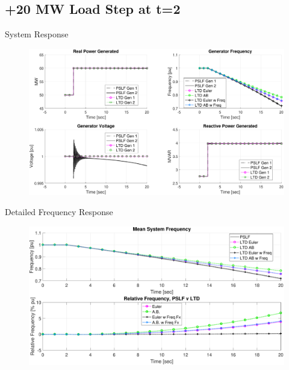 \documentclass[14pt, unknownkeysallowed]{beamer}
\begin{document}
\subsection{+20 MW Load Step at t=2}
\begin{frame}
System Response
\begin{figure}
	\includegraphics[width=\linewidth]{noGovExcLoadStepUpsys}
\end{figure}
\end{frame}
\begin{frame}
Detailed Frequency Response
\begin{figure}
	\includegraphics[width=\linewidth]{noGovExcLoadStepUpfreq}
\end{figure}
\end{frame}

\end{document}
